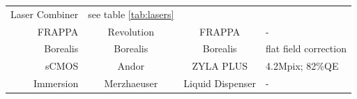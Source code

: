 \documentclass[11pt,singlespacinge,twoside]{reedthesis} %
\theoremstyle{definition}
\theoremstyle{definition}
\theoremstyle{definition}
\theoremstyle{remark}
\begin{document}
\begin{longtable}[]{@{}rccl@{}}
\begin{minipage}[t]{0.23\columnwidth}
Laser Combiner\strut
\end{minipage} & \begin{minipage}[t]{0.30\columnwidth}\raggedright
see table \ref{tab:lasers}\strut
\end{minipage}\tabularnewline
\begin{minipage}[t]{0.20\columnwidth}\raggedleft
FRAPPA\strut
\end{minipage} & \begin{minipage}[t]{0.16\columnwidth}\centering
Revolution\strut
\end{minipage} & \begin{minipage}[t]{0.23\columnwidth}\centering
FRAPPA\strut
\end{minipage} & \begin{minipage}[t]{0.30\columnwidth}\raggedright
-\strut
\end{minipage}\tabularnewline
\begin{minipage}[t]{0.20\columnwidth}\raggedleft
Borealis\strut
\end{minipage} & \begin{minipage}[t]{0.16\columnwidth}\centering
Borealis\strut
\end{minipage} & \begin{minipage}[t]{0.23\columnwidth}\centering
Borealis\strut
\end{minipage} & \begin{minipage}[t]{0.30\columnwidth}\raggedright
flat field correction\strut
\end{minipage}\tabularnewline
\begin{minipage}[t]{0.20\columnwidth}\raggedleft
sCMOS\strut
\end{minipage} & \begin{minipage}[t]{0.16\columnwidth}\centering
Andor\strut
\end{minipage} & \begin{minipage}[t]{0.23\columnwidth}\centering
ZYLA PLUS\strut
\end{minipage} & \begin{minipage}[t]{0.30\columnwidth}\raggedright
4.2Mpix; 82\%QE\strut
\end{minipage}\tabularnewline
\begin{minipage}[t]{0.20\columnwidth}\raggedleft
Immersion\strut
\end{minipage} & \begin{minipage}[t]{0.16\columnwidth}\centering
Merzhaeuser\strut
\end{minipage} & \begin{minipage}[t]{0.23\columnwidth}\centering
Liquid Dispenser\strut
\end{minipage} & \begin{minipage}[t]{0.30\columnwidth}\raggedright
-\strut
\end{minipage}\tabularnewline
\bottomrule
\end{longtable}
\end{document}
